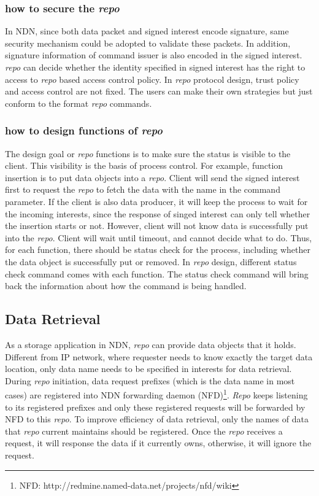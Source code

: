 \documentclass[conference]{IEEEtran}
\begin{document}
\subsubsection{how to secure the \emph{repo}}

In NDN, since both data packet and signed interest encode signature, same security mechanism could be adopted to validate these packets. In addition, signature information of command issuer is also encoded in the signed interest. \emph{repo} can decide whether the identity specified in signed interest has the right to access to \emph{repo} based access control policy. In \emph{repo} protocol design, trust policy and access control are not fixed. The users can make their own strategies but just conform to the format \emph{repo} commands.

\subsubsection{how to design functions of \emph{repo}}

The design goal or \emph{repo} functions is to make sure the status is visible to the client. This visibility is the basis of process control. For example, function insertion is to put data objects into a \emph{repo}. Client will send the signed interest first to request the \emph{repo} to fetch the data with the name in the command parameter. If the client is also data producer, it will keep the process to wait for the incoming interests, since the response of singed interest can only tell whether the insertion starts or not. However, client will not know data is successfully put into the \emph{repo}. Client will wait until timeout, and cannot decide what to do. Thus, for each function, there should be status check for the process, including whether the data object is successfully put or removed. In \emph{repo} design, different status check command comes with each function. The status check command will bring back the information about how the command is being handled.

\subsection{Data Retrieval}

As a storage application in NDN, \emph{repo} can provide data objects that it holds. Different from IP network, where requester needs to know exactly the target data location, only data name needs to be specified in interests for data retrieval. During \emph{repo} initiation, data request prefixes (which is the data name in most cases) are registered into NDN forwarding daemon (NFD)\footnote{NFD: http://redmine.named-data.net/projects/nfd/wiki}. \emph{Repo} keeps listening to its registered prefixes and only these registered requests will be forwarded by NFD to this \emph{repo}. To improve efficiency of data retrieval, only the names of data that \emph{repo} current maintains should be registered. Once the \emph{repo} receives a request, it will response the data if it currently owns, otherwise, it will ignore the request.
\end{document}
